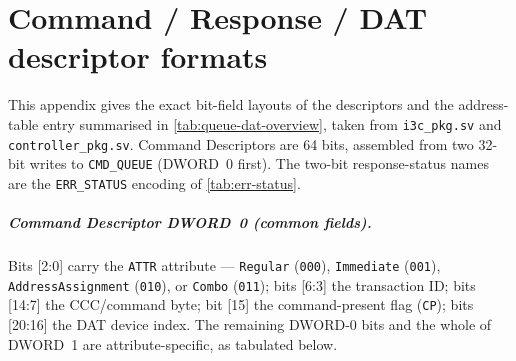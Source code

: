 \chapter{Command / Response / DAT descriptor formats}
\label{app:descriptors}

This appendix gives the exact bit-field layouts of the descriptors and the address-table
entry summarised in \cref{tab:queue-dat-overview}, taken from \texttt{i3c\_pkg.sv} and
\texttt{controller\_pkg.sv}. Command Descriptors are 64 bits, assembled from two 32-bit
writes to \texttt{CMD\_QUEUE} (DWORD~0 first). The two-bit response-status names are the
\texttt{ERR\_STATUS} encoding of \cref{tab:err-status}.

\paragraph{Command Descriptor DWORD~0 (common fields).} Bits [2:0] carry the
\texttt{ATTR} attribute --- \texttt{Regular} (\texttt{000}), \texttt{Immediate}
(\texttt{001}), \texttt{AddressAssignment} (\texttt{010}), or \texttt{Combo}
(\texttt{011}); bits [6:3] the transaction ID; bits [14:7] the CCC/command byte; bit [15]
the command-present flag (\texttt{CP}); bits [20:16] the DAT device index. The remaining
DWORD-0 bits and the whole of DWORD~1 are attribute-specific, as tabulated below.

